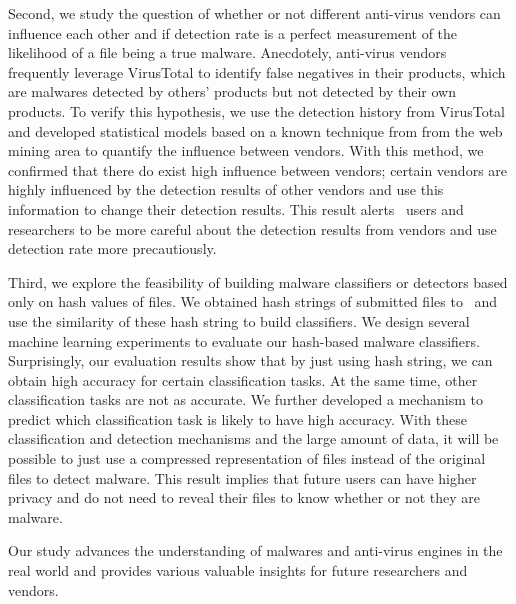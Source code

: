 Second, we study the question of whether or not different anti-virus vendors can influence each other
and if detection rate is a perfect measurement of the likelihood of a file being a true malware.
Anecdotely, anti-virus vendors frequently leverage VirusTotal to identify false negatives in their products, 
which are malwares detected by others’ products but not detected by their own products. 
To verify this hypothesis, we use the detection history from VirusTotal 
and developed statistical models based on a known technique from from the web mining area to quantify the influence between vendors. 
With this method, we confirmed that there do exist high influence between vendors;
certain vendors are highly influenced by the detection results of other vendors and use this information to change their detection results.
This result alerts \vt\ users and researchers to be more careful about the detection results from vendors 
and use detection rate more precautiously.

Third, we explore the feasibility of building malware classifiers or detectors based only on hash values of files.
We obtained hash strings of submitted files to \vt\ 
and use the similarity of these hash string to build classifiers.
We design several machine learning experiments to evaluate our hash-based malware classifiers. 
Surprisingly, our evaluation results show that by just using hash string, 
we can obtain high accuracy for certain classification tasks.
At the same time, other classification tasks are not as accurate.
We further developed a mechanism to predict which classification task is likely to have high accuracy.
With these classification and detection mechanisms and the large amount of data,
it will be possible to just use a compressed representation of files instead of the original files 
to detect malware.
This result implies that future users can have higher privacy and do not need to reveal their files to know whether or not they are malware.

Our study advances the understanding of malwares and anti-virus engines in the real world 
and provides various valuable insights for future researchers and vendors.

